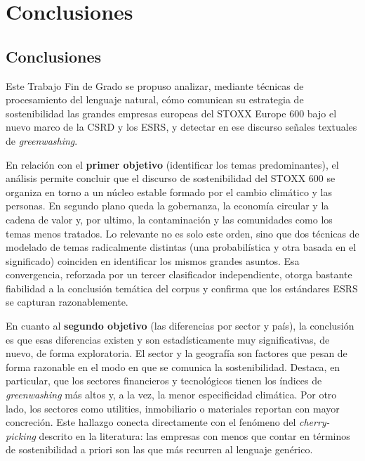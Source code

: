 \chapter{Conclusiones}
\label{cap:conclusiones}

\section{Conclusiones}
\label{sec:conclusiones}

Este Trabajo Fin de Grado se propuso analizar, mediante técnicas de procesamiento del lenguaje
natural, cómo comunican su estrategia de sostenibilidad las grandes empresas europeas del STOXX
Europe 600 bajo el nuevo marco de la CSRD y los ESRS, y detectar en ese discurso señales
textuales de \textit{greenwashing}.

En relación con el \textbf{primer objetivo} (identificar los temas predominantes), el análisis
permite concluir que el discurso de sostenibilidad del STOXX 600 se organiza en torno a un
núcleo estable formado por el cambio climático y las personas. En segundo plano queda la gobernanza, la economía
circular y la cadena de valor y, por ultimo, la contaminación y las comunidades como
los temas menos tratados. Lo relevante no es solo este orden, sino que dos técnicas de modelado
de temas radicalmente distintas (una probabilística y otra basada en el significado) coinciden
en identificar los mismos grandes asuntos. Esa convergencia, reforzada por un tercer clasificador
independiente, otorga bastante fiabilidad a la conclusión temática del corpus y confirma
que los estándares ESRS se capturan razonablemente.

En cuanto al \textbf{segundo objetivo} (las diferencias por sector y país), la conclusión es que
esas diferencias existen y son estadísticamente muy significativas, de nuevo, de forma exploratoria. El sector y la geografía
son factores que pesan de forma razonable en el modo en que se comunica la
sostenibilidad. Destaca, en particular, que los sectores financieros y tecnológicos tienen los
índices de \textit{greenwashing} más altos y, a la vez, la menor especificidad climática. Por otro lado,
los sectores como utilities, inmobiliario o materiales reportan con mayor concreción. Este hallazgo conecta directamente con el fenómeno del
\textit{cherry-picking} descrito en la literatura: las empresas con menos que contar en términos de sostenibilidad a priori son las que más recurren al lenguaje genérico.

